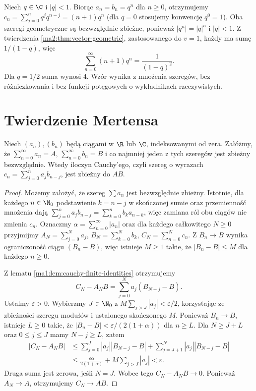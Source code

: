 \begin{przyklad}
\label{ma1:ex:geometric-product}
Niech $q\in\C$ i $|q|<1$. Biorąc $a_n=b_n=q^n$ dla $n\ge0$, otrzymujemy $c_n=\sum_{j=0}^n q^jq^{n-j}=(n+1)q^n$ (dla $q=0$ stosujemy konwencję $q^0=1$). Oba szeregi geometryczne są bezwzględnie zbieżne, ponieważ $|q^n|=|q|^n$ i $|q|<1$. Z twierdzenia \ref{ma2:thm:vector-geometric}, zastosowanego do $v=1$, każdy ma sumę $1/(1-q)$, więc
\[
 \sum_{n=0}^\infty (n+1)q^n=\frac1{(1-q)^2}.
\]
Dla $q=1/2$ suma wynosi $4$. Wzór wynika z mnożenia szeregów, bez różniczkowania i bez funkcji potęgowych o wykładnikach rzeczywistych.
\end{przyklad}

\section{Twierdzenie Mertensa}
\begin{twierdzenie}[Mertensa]
\label{ma1:thm:mertens-product}
Niech $(a_n),(b_n)$ będą ciągami w $\R$ lub $\C$, indeksowanymi od zera. Załóżmy, że $\sum_{n=0}^\infty a_n=A$, $\sum_{n=0}^\infty b_n=B$ i co najmniej jeden z tych szeregów jest zbieżny bezwzględnie. Wtedy iloczyn Cauchy'ego, czyli szereg o wyrazach $c_n=\sum_{j=0}^n a_jb_{n-j}$, jest zbieżny do $AB$.
\end{twierdzenie}
\begin{proof}
Możemy założyć, że szereg $\sum a_n$ jest bezwzględnie zbieżny. Istotnie, dla każdego $n\in\N_0$ podstawienie $k=n-j$ w skończonej sumie oraz przemienność mnożenia dają $\sum_{j=0}^n a_jb_{n-j}=\sum_{k=0}^n b_ka_{n-k}$, więc zamiana ról obu ciągów nie zmienia $c_n$. Oznaczmy $\alpha=\sum_{n=0}^\infty|a_n|$ oraz dla każdego całkowitego $N\ge0$ przyjmijmy $A_N=\sum_{j=0}^N a_j$, $B_N=\sum_{k=0}^N b_k$, $C_N=\sum_{n=0}^N c_n$. Z $B_n\to B$ wynika ograniczoność ciągu $(B_n-B)$, więc istnieje $M\ge1$ takie, że $|B_n-B|\le M$ dla każdego $n\ge0$.

Z lematu \ref{ma1:lem:cauchy-finite-identities} otrzymujemy
\[
 C_N-A_N B=\sum_{j=0}^N a_j(B_{N-j}-B).
\]
Ustalmy $\varepsilon>0$. Wybierzmy $J\in\N_0$ z $M\sum_{j>J}|a_j|<\varepsilon/2$, korzystając ze zbieżności szeregu modułów i ustalonego skończonego $M$. Ponieważ $B_n\to B$, istnieje $L\ge0$ takie, że $|B_n-B|<\varepsilon/(2(1+\alpha))$ dla $n\ge L$. Dla $N\ge J+L$ oraz $0\le j\le J$ mamy $N-j\ge L$, zatem
\[
\begin{aligned}
 |C_N-A_N B|
 &\le\sum_{j=0}^J |a_j||B_{N-j}-B|
      +\sum_{j=J+1}^N |a_j||B_{N-j}-B|\\
 &\le\frac{\varepsilon\alpha}{2(1+\alpha)}
        +M\sum_{j>J}|a_j|
 <\varepsilon.
\end{aligned}
\]
Druga suma jest zerowa, jeśli $N=J$. Wobec tego $C_N-A_NB\to0$. Ponieważ $A_N\to A$, otrzymujemy $C_N\to AB$.
\end{proof}

